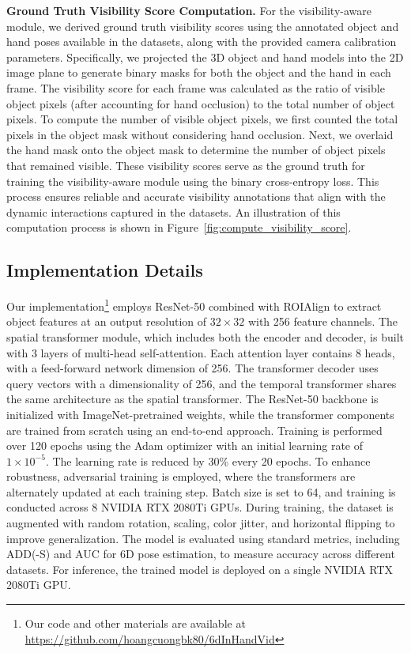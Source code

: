 \noindent \textbf{Ground Truth Visibility Score Computation.} For the visibility-aware module, we derived ground truth visibility scores using the annotated object and hand poses available in the datasets, along with the provided camera calibration parameters. Specifically, we projected the 3D object and hand models into the 2D image plane to generate binary masks for both the object and the hand in each frame. The visibility score for each frame was calculated as the ratio of visible object pixels (after accounting for hand occlusion) to the total number of object pixels. To compute the number of visible object pixels, we first counted the total pixels in the object mask without considering hand occlusion. Next, we overlaid the hand mask onto the object mask to determine the number of object pixels that remained visible. These visibility scores serve as the ground truth for training the visibility-aware module using the binary cross-entropy loss. This process ensures reliable and accurate visibility annotations that align with the dynamic interactions captured in the datasets. An illustration of this computation process is shown in Figure~\ref{fig:compute_visibility_score}.

\subsection{Implementation Details}

Our implementation\footnote{Our code and other materials are available at \url{https://github.com/hoangcuongbk80/6dInHandVid}} employs ResNet-50 \cite{he2016deep} combined with ROIAlign \cite{he2017mask} to extract object features at an output resolution of $32 \times 32$ with 256 feature channels. The spatial transformer module, which includes both the encoder and decoder, is built with 3 layers of multi-head self-attention. Each attention layer contains 8 heads, with a feed-forward network dimension of 256. The transformer decoder uses query vectors with a dimensionality of 256, and the temporal transformer shares the same architecture as the spatial transformer. The ResNet-50 backbone is initialized with ImageNet-pretrained weights, while the transformer components are trained from scratch using an end-to-end approach. Training is performed over 120 epochs using the Adam optimizer with an initial learning rate of $1 \times 10^{-5}$. The learning rate is reduced by 30\% every 20 epochs. To enhance robustness, adversarial training is employed, where the transformers are alternately updated at each training step. Batch size is set to 64, and training is conducted across 8 NVIDIA RTX 2080Ti GPUs. During training, the dataset is augmented with random rotation, scaling, color jitter, and horizontal flipping to improve generalization. The model is evaluated using standard metrics, including ADD(-S) and AUC for 6D pose estimation, to measure accuracy across different datasets. For inference, the trained model is deployed on a single NVIDIA RTX 2080Ti GPU.

